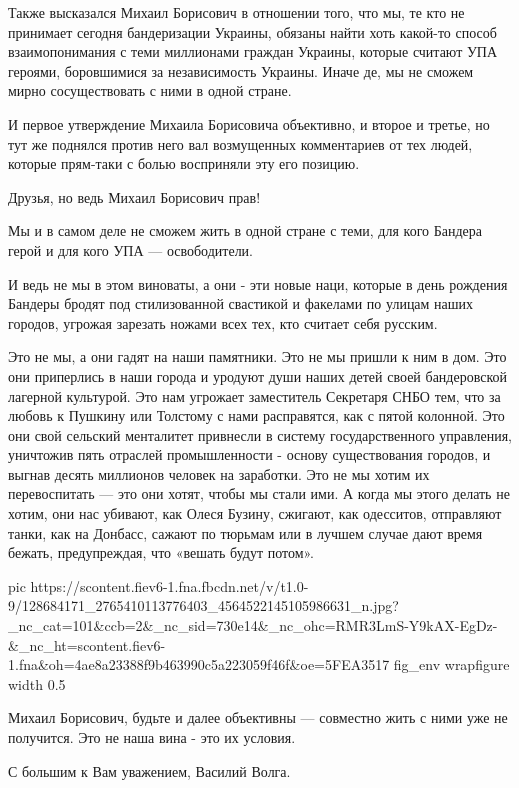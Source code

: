 Также высказался Михаил Борисович в отношении того, что мы, те кто не принимает
сегодня бандеризации Украины, обязаны найти хоть какой-то способ
взаимопонимания с теми миллионами граждан Украины, которые считают УПА героями,
боровшимися за независимость Украины. Иначе де, мы не сможем мирно
сосуществовать с ними в одной стране. 

И первое утверждение Михаила Борисовича объективно, и второе и третье, но тут
же поднялся против него вал возмущенных комментариев от тех людей, которые
прям-таки с болью восприняли эту его позицию. 

Друзья, но ведь Михаил Борисович прав!

Мы и в самом деле не сможем жить в одной стране с теми, для кого Бандера герой
и для кого УПА --- освободители. 

И ведь не мы в этом виноваты, а они - эти новые наци, которые в день рождения
Бандеры бродят под стилизованной свастикой и факелами по улицам наших городов,
угрожая зарезать ножами всех тех, кто считает себя русским. 

Это не мы, а они гадят на наши памятники. Это не мы пришли к ним в дом. Это они
приперлись в наши города и уродуют души наших детей своей бандеровской лагерной
культурой. Это нам угрожает заместитель Секретаря СНБО тем, что за любовь к
Пушкину или Толстому с нами расправятся, как с пятой колонной. Это они свой
сельский менталитет привнесли в систему государственного управления, уничтожив
пять отраслей промышленности - основу существования городов, и выгнав десять
миллионов человек на заработки. Это не мы хотим их перевоспитать --- это они
хотят, чтобы мы стали ими. А когда мы этого делать не хотим, они нас убивают,
как Олеся Бузину, сжигают, как одесситов, отправляют танки, как на Донбасс,
сажают по тюрьмам или в лучшем случае дают время бежать, предупреждая, что
«вешать будут потом». 

\ifcmt
pic https://scontent.fiev6-1.fna.fbcdn.net/v/t1.0-9/128684171_2765410113776403_4564522145105986631_n.jpg?_nc_cat=101&ccb=2&_nc_sid=730e14&_nc_ohc=RMR3LmS-Y9kAX-EgDz-&_nc_ht=scontent.fiev6-1.fna&oh=4ae8a23388f9b463990c5a223059f46f&oe=5FEA3517
fig_env wrapfigure
width 0.5
\fi

Михаил Борисович, будьте и далее объективны --- совместно жить с ними уже не
получится. Это не наша вина - это их условия. 

С большим к Вам уважением, Василий Волга.
